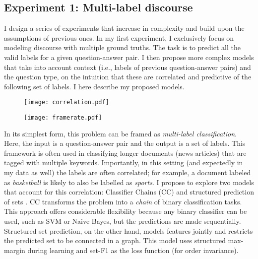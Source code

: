 \subsection{Experiment 1: Multi-label discourse} 
I design a series of experiments that increase in complexity and build upon the assumptions of previous ones. In my first experiment, I exclusively focus on modeling discourse with multiple ground truths. The task is to predict all the valid labels for a given question-answer pair. I then propose more complex models that take into account context (i.e., labels of previous question-answer pairs) and the question type, on the intuition that these are correlated and predictive of the following set of labels. I here describe my proposed models.

\begin{figure}
\RawFloats
\centering
\begin{minipage}{.6\textwidth}
  \centering
  \texttt{[image: correlation.pdf]}
  \vspace{-2.5em}
  \label{fig:correlation}
\end{minipage}%
\hspace*{.04em}
\begin{minipage}{.6\textwidth}
  \centering
  \texttt{[image: framerate.pdf]}
  \vspace{-2.5em}
  \label{fig:framerate}
\end{minipage}
\end{figure}

 In its simplest form, this problem can be framed as \emph{multi-label classification}. Here, the input is a question-answer pair and the output is a set of labels. This framework is often used in classifying longer documents (news articles) that are tagged with multiple keywords. Importantly, in this setting (and expectedly in my data as well) the labels are often correlated; for example, a document labeled as \textit{basketball} is likely to also be labelled as \textit{sports}. I propose to explore two models that account for this correlation: Classifier Chains (\textsc{CC}) \cite{Read:2011} and structured prediction of sets \cite{Rabinovich:2017}. \textsc{CC} transforms the problem into a \emph{chain} of binary classification tasks. This approach offers considerable flexibility because any binary classifier can be used, such as SVM or Naive Bayes, but the predictions are made sequentially. Structured set prediction, on the other hand, models features jointly and restricts the predicted set to be connected in a graph. This model uses structured max-margin during learning and set-F1 as the loss function (for order invariance).

